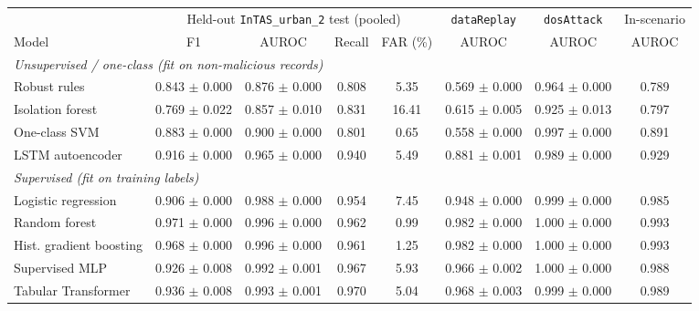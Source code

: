 \begin{tabular}{lccccccc}
\toprule
& \multicolumn{4}{c}{Held-out \texttt{InTAS\_urban\_2} test (pooled)} & \texttt{dataReplay} & \texttt{dosAttack} & In-scenario \\
\cmidrule(lr){2-5}\cmidrule(lr){6-7}
Model & F1 & AUROC & Recall & FAR (\%) & AUROC & AUROC & AUROC \\
\midrule
\multicolumn{8}{l}{\textit{Unsupervised / one-class (fit on non-malicious records)}} \\
Robust rules & 0.843 $\pm$ 0.000 & 0.876 $\pm$ 0.000 & 0.808 & 5.35 & 0.569 $\pm$ 0.000 & 0.964 $\pm$ 0.000 & 0.789 \\
Isolation forest & 0.769 $\pm$ 0.022 & 0.857 $\pm$ 0.010 & 0.831 & 16.41 & 0.615 $\pm$ 0.005 & 0.925 $\pm$ 0.013 & 0.797 \\
One-class SVM & 0.883 $\pm$ 0.000 & 0.900 $\pm$ 0.000 & 0.801 & 0.65 & 0.558 $\pm$ 0.000 & 0.997 $\pm$ 0.000 & 0.891 \\
LSTM autoencoder & 0.916 $\pm$ 0.000 & 0.965 $\pm$ 0.000 & 0.940 & 5.49 & 0.881 $\pm$ 0.001 & 0.989 $\pm$ 0.000 & 0.929 \\
\midrule
\multicolumn{8}{l}{\textit{Supervised (fit on training labels)}} \\
Logistic regression & 0.906 $\pm$ 0.000 & 0.988 $\pm$ 0.000 & 0.954 & 7.45 & 0.948 $\pm$ 0.000 & 0.999 $\pm$ 0.000 & 0.985 \\
Random forest & 0.971 $\pm$ 0.000 & 0.996 $\pm$ 0.000 & 0.962 & 0.99 & 0.982 $\pm$ 0.000 & 1.000 $\pm$ 0.000 & 0.993 \\
Hist. gradient boosting & 0.968 $\pm$ 0.000 & 0.996 $\pm$ 0.000 & 0.961 & 1.25 & 0.982 $\pm$ 0.000 & 1.000 $\pm$ 0.000 & 0.993 \\
Supervised MLP & 0.926 $\pm$ 0.008 & 0.992 $\pm$ 0.001 & 0.967 & 5.93 & 0.966 $\pm$ 0.002 & 1.000 $\pm$ 0.000 & 0.988 \\
Tabular Transformer & 0.936 $\pm$ 0.008 & 0.993 $\pm$ 0.001 & 0.970 & 5.04 & 0.968 $\pm$ 0.003 & 0.999 $\pm$ 0.000 & 0.989 \\
\bottomrule
\end{tabular}
